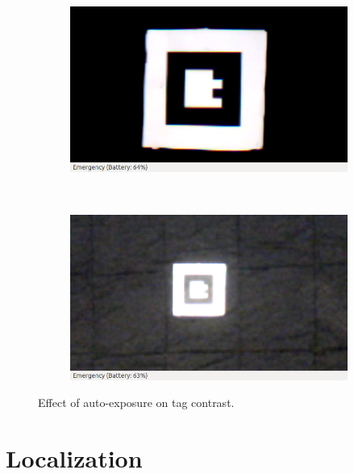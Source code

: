 			\begin{figure}[ht]
			        \centering
			        \begin{subfigure}[b]{0.4\textwidth}
			                \centering
			                \includegraphics[width=\textwidth]{../images/exposure_good.png}
			                \label{fig:exposuregood}
			        \end{subfigure}
			        ~
			        \begin{subfigure}[b]{0.4\textwidth}
			                \centering
			                \includegraphics[width=\textwidth]{../images/exposure_bad.png}
			                \label{fig:exposurebad}
			        \end{subfigure}
			        \caption{Effect of auto-exposure on tag contrast.} \label{fig:exposure}
			\end{figure}

\section{Localization}
	
